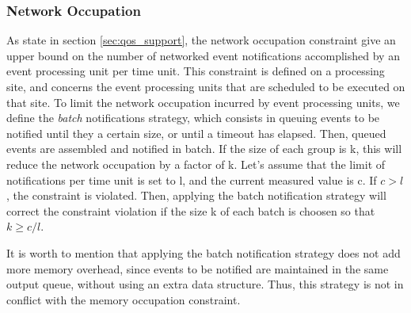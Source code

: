 \documentclass[a4paper,twoside]{article}
\begin{document}
\subsubsection{Network Occupation} 
As state in section \ref{sec:qos_support}, the network occupation constraint give an upper bound on the number of networked event notifications accomplished by an event processing unit per time unit. This constraint is defined on a processing site, and concerns the event processing units that are scheduled to be executed on that site. To limit the network occupation incurred by event processing units, we define the \textit{batch} notifications strategy, which consists in queuing events to be notified until they a certain size, or until a timeout has elapsed. Then, queued events are assembled and notified in batch. If the size of each group is k, this will reduce the network occupation by a factor of k. Let's assume that the limit of notifications per time unit is set to l, and the current measured value is c. If  $c > l$ , the constraint is violated. Then, applying the batch notification strategy will correct the constraint violation if the size k of each batch is choosen so that $k \geq c/l$. 

It is worth to mention that applying the batch notification strategy does not add more memory overhead, since events to be notified are maintained in the same output queue, without using an extra data structure. Thus, this strategy is not in conflict with the memory occupation constraint.
\end{document}
